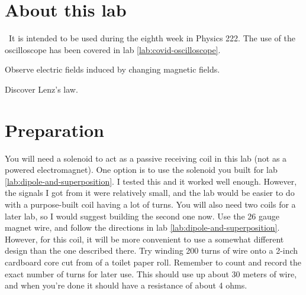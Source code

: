 \renewcommand\thechapter{c2.8}
\label{lab:covid-electromagnetism}

\section*{About this lab}

\covid\ 
It is intended to be used during the eighth week in Physics 222.
The use of the oscilloscope has been covered in lab \ref{lab:covid-oscilloscope}.

\apparatus
{}
\equip{tape (not included in kit)}

\begin{goals}

\item[] Observe electric fields induced by changing magnetic fields.

\item[] Discover Lenz's law.

\end{goals}

\section*{Preparation}

You will need a solenoid to act as a passive receiving coil in this lab (not as a powered electromagnet).
One option is to use the solenoid you built for lab \ref{lab:dipole-and-superposition}. I tested this
and it worked well enough. However, the signals I got from it were relatively small, and the lab would
be easier to do with a purpose-built coil having a lot of turns. You will also need two coils for
a later lab, so I would suggest building the second one now. Use the 26 gauge magnet wire, and follow
the directions in lab \ref{lab:dipole-and-superposition}. However, for this coil, it will be more
convenient to use a somewhat different design than the one described there. Try winding 200 turns of
wire onto a 2-inch cardboard core cut from of a toilet paper roll. Remember to count and record the
exact number of turns for later use. This should use up about 30 meters of wire, and when you're
done it should have a resistance of about 4 ohms.

\introduction

